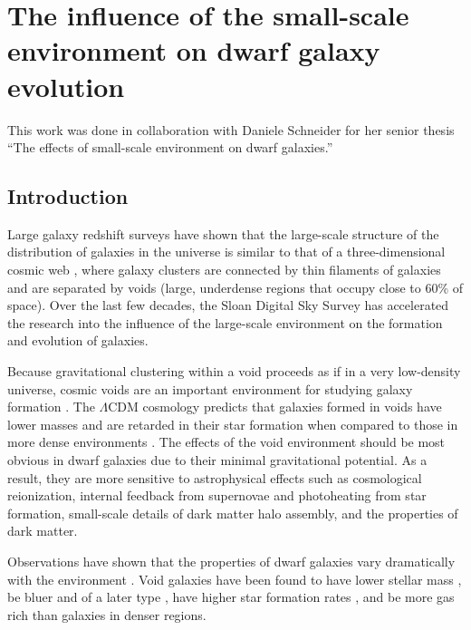 \chapter[Small-scale environment]{The influence of the small-scale environment on dwarf galaxy evolution}


This work was done in collaboration with Daniele Schneider for her senior thesis 
``The effects of small-scale environment on dwarf galaxies.''




\section[Introduction]{Introduction}

Large galaxy redshift surveys have shown that the large-scale structure of the 
distribution of galaxies in the universe is similar to that of a 
three-dimensional cosmic web \citep{Bond96}, where galaxy clusters are connected 
by thin filaments of galaxies and are separated by voids (large, underdense 
regions that occupy close to 60\% of space).  Over the last few decades, the 
Sloan Digital Sky Survey \citep{Abazajian09,Ahn12} has accelerated the research 
into the influence of the large-scale environment on the formation and evolution 
of galaxies.

Because gravitational clustering within a void proceeds as if in a very 
low-density universe, cosmic voids are an important environment for studying 
galaxy formation \citep[see][for a review]{vandeWeygaert11}.  The $\Lambda$CDM 
cosmology predicts that galaxies formed in voids have lower masses and are 
retarded in their star formation when compared to those in more dense 
environments \citep{Gottlober03,Goldberg05,Cen11}.  The effects of the void 
environment should be most obvious in dwarf galaxies due to their minimal 
gravitational potential.  As a result, they are more sensitive to astrophysical 
effects such as cosmological reionization, internal feedback from supernovae and 
photoheating from star formation, small-scale details of dark matter halo 
assembly, and the properties of dark matter.

Observations have shown that the properties of dwarf galaxies vary dramatically 
with the environment \citep[e.g.,][]{Ann08,Geha12}.  Void galaxies have been 
found to have lower stellar mass \citep{Hoyle05,Croton05,Moorman15}, be bluer 
and of a later type \citep{Grogin00,Rojas04,Patiri06,Park07,vonBendaBeckmann08,
Hoyle12}, have higher star formation rates \citep{Rojas05,Moorman15,Beygu16}, 
and be more gas rich \citep{Kreckel12,Moorman16,Jones16} than galaxies in denser 
regions.

